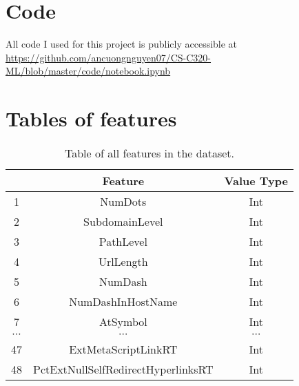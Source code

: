 \section{Code}
All code I used for this project is publicly accessible at \url{https://github.com/ancuongnguyen07/CS-C320-ML/blob/master/code/notebook.ipynb}

\section{Tables of features}
\begin{table}
    \centering
    \begin{tabular}{|c|c|c|}
        \hline
         & Feature & Value Type \\
        \hline
        1 & NumDots & Int \\
        \hline
        2 & SubdomainLevel & Int \\
        \hline
        3 & PathLevel & Int \\
        \hline
        4 & UrlLength & Int \\
        \hline
        5 & NumDash & Int \\
        \hline
        6 & NumDashInHostName & Int \\
        \hline
        7 & AtSymbol & Int \\
        \hline
        $\cdots$ & $\cdots$ & $\cdots$ \\
        \hline
        47 & ExtMetaScriptLinkRT & Int \\
        \hline
        48 & PctExtNullSelfRedirectHyperlinksRT & Int \\
        \hline
    \end{tabular}
    \caption{Table of all features in the dataset.}\label{tab:all_features}
\end{table}


